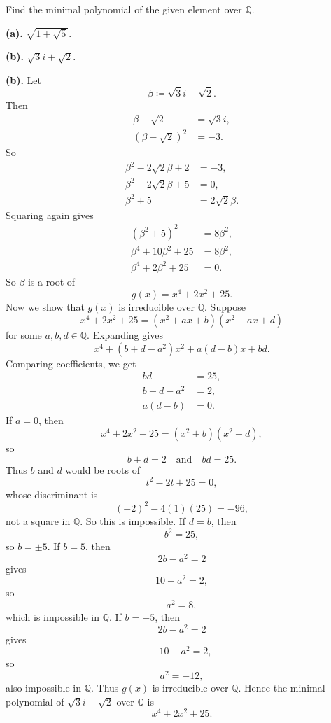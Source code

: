 \begin{problem}{
    Find the minimal polynomial of the given element over $\mathbb{Q}$.

    \textbf{(a).}
    $\sqrt{1+\sqrt{5}}$.

    \textbf{(b).}
    $\sqrt{3}i + \sqrt{2}$.
}
    \textbf{(b).}
    Let
    \[
        \beta \coloneqq \sqrt{3}i + \sqrt{2}.
    \]
    Then
    \begin{align*}
        \beta - \sqrt{2} &= \sqrt{3}i,\\
        (\beta - \sqrt{2})^2 &= -3.
    \end{align*}
    So
    \begin{align*}
        \beta^2 - 2\sqrt{2}\beta + 2 &= -3,\\
        \beta^2 - 2\sqrt{2}\beta + 5 &= 0,\\
        \beta^2 + 5 &= 2\sqrt{2}\beta.
    \end{align*}
    Squaring again gives
    \begin{align*}
        (\beta^2 + 5)^2 &= 8\beta^2,\\
        \beta^4 + 10\beta^2 + 25 &= 8\beta^2,\\
        \beta^4 + 2\beta^2 + 25 &= 0.
    \end{align*}
    So $\beta$ is a root of
    \[
        g(x) = x^4 + 2x^2 + 25.
    \]
    Now we show that $g(x)$ is irreducible over $\mathbb{Q}$.
    Suppose
    \[
        x^4 + 2x^2 + 25 = (x^2 + ax + b)(x^2 - ax + d)
    \]
    for some $a,b,d\in\mathbb{Q}$.
    Expanding gives
    \[
        x^4 + (b+d-a^2)x^2 + a(d-b)x + bd.
    \]
    Comparing coefficients, we get
    \begin{align*}
        bd &= 25,\\
        b+d-a^2 &= 2,\\
        a(d-b) &= 0.
    \end{align*}
    If $a=0$, then
    \[
        x^4 + 2x^2 + 25 = (x^2+b)(x^2+d),
    \]
    so
    \[
        b+d = 2
        \quad\text{and}\quad
        bd = 25.
    \]
    Thus $b$ and $d$ would be roots of
    \[
        t^2 - 2t + 25 = 0,
    \]
    whose discriminant is
    \[
        (-2)^2 - 4(1)(25) = -96,
    \]
    not a square in $\mathbb{Q}$.
    So this is impossible.
    If $d=b$, then
    \[
        b^2 = 25,
    \]
    so $b=\pm 5$.
    If $b=5$, then
    \[
        2b - a^2 = 2
    \]
    gives
    \[
        10 - a^2 = 2,
    \]
    so
    \[
        a^2 = 8,
    \]
    which is impossible in $\mathbb{Q}$.
    If $b=-5$, then
    \[
        2b - a^2 = 2
    \]
    gives
    \[
        -10 - a^2 = 2,
    \]
    so
    \[
        a^2 = -12,
    \]
    also impossible in $\mathbb{Q}$.
    Thus $g(x)$ is irreducible over $\mathbb{Q}$.
    Hence the minimal polynomial of $\sqrt{3}i + \sqrt{2}$ over $\mathbb{Q}$ is
    \[
        x^4 + 2x^2 + 25.
    \]
\end{problem}